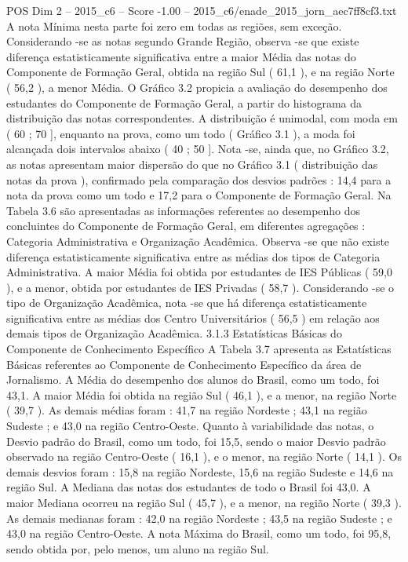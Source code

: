 \begin{textsample}{POS Dim 2 – 2015\_c6 – Score -1.00 – 2015\_c6/enade\_2015\_jorn\_aec7ff8cf3.txt}
A nota Mínima nesta parte foi zero em todas as regiões, sem exceção.
Considerando -se as notas segundo Grande Região, observa -se que existe diferença estatisticamente significativa entre a maior Média das notas do Componente de Formação Geral, obtida na região Sul ( 61,1 ), e na região Norte ( 56,2 ), a menor Média.
O Gráfico 3.2 propicia a avaliação do desempenho dos estudantes do Componente de Formação Geral, a partir do histograma da distribuição das notas correspondentes.
A distribuição é unimodal, com moda em ( 60 ; 70 ], enquanto na prova, como um todo ( Gráfico 3.1 ), a moda foi alcançada dois intervalos abaixo ( 40 ; 50 ].
Nota -se, ainda que, no Gráfico 3.2, as notas apresentam maior dispersão do que no Gráfico 3.1 ( distribuição das notas da prova ), confirmado pela comparação dos desvios padrões : 14,4 para a nota da prova como um todo e 17,2 para o Componente de Formação Geral.
Na Tabela 3.6 são apresentadas as informações referentes ao desempenho dos concluintes do Componente de Formação Geral, em diferentes agregações : Categoria Administrativa e Organização Acadêmica.
Observa -se que não existe diferença estatisticamente significativa entre as médias dos tipos de Categoria Administrativa.
A maior Média foi obtida por estudantes de IES Públicas ( 59,0 ), e a menor, obtida por estudantes de IES Privadas ( 58,7 ).
Considerando -se o tipo de Organização Acadêmica, nota -se que há diferença estatisticamente significativa entre as médias dos Centro Universitários ( 56,5 ) em relação aos demais tipos de Organização Acadêmica. 3.1.3 Estatísticas Básicas do Componente de Conhecimento Específico A Tabela 3.7 apresenta as Estatísticas Básicas referentes ao Componente de Conhecimento Específico da área de Jornalismo.
A Média do desempenho dos alunos do Brasil, como um todo, foi 43,1.
A maior Média foi obtida na região Sul ( 46,1 ), e a menor, na região Norte ( 39,7 ).
As demais médias foram : 41,7 na região Nordeste ; 43,1 na região Sudeste ; e 43,0 na região Centro-Oeste.
Quanto à variabilidade das notas, o Desvio padrão do Brasil, como um todo, foi 15,5, sendo o maior Desvio padrão observado na região Centro-Oeste ( 16,1 ), e o menor, na região Norte ( 14,1 ).
Os demais desvios foram : 15,8 na região Nordeste, 15,6 na região Sudeste e 14,6 na região Sul.
A Mediana das notas dos estudantes de todo o Brasil foi 43,0.
A maior Mediana ocorreu na região Sul ( 45,7 ), e a menor, na região Norte ( 39,3 ).
As demais medianas foram : 42,0 na região Nordeste ; 43,5 na região Sudeste ; e 43,0 na região Centro-Oeste.
A nota Máxima do Brasil, como um todo, foi 95,8, sendo obtida por, pelo menos, um aluno na região Sul.

\end{textsample}
